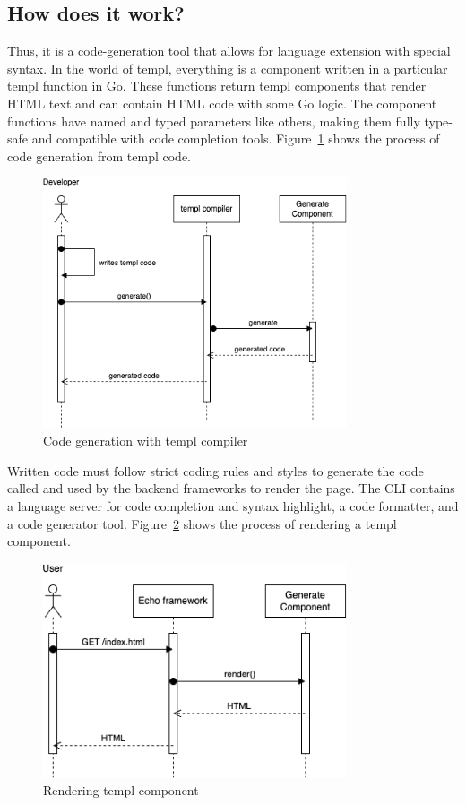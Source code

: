 \subsection{How does it work?}
Thus, it is a code-generation tool that allows for language extension with special syntax. In the world of templ, everything is a component written in a particular templ function in Go. These functions return templ components that render HTML text and can contain HTML code with some Go logic. The component functions have named and typed parameters like others, making them fully type-safe and compatible with code completion tools. Figure~\ref{fig:templ-generation} shows the process of code generation from templ code.

\begin{figure}[!h]
    \centering
    \includegraphics[width=0.8\textwidth, keepaspectratio]{figures/templ_sequence_generation.drawio.png}
    \caption{Code generation with templ compiler}
    \label{fig:templ-generation}
\end{figure}

Written code must follow strict coding rules and styles to generate the code called and used by the backend frameworks to render the page. The CLI contains a language server for code completion and syntax highlight, a code formatter, and a code generator tool. Figure~\ref{fig:templ-rendering} shows the process of rendering a templ component.

\begin{figure}[!h]
    \centering
    \includegraphics[width=0.8\textwidth, keepaspectratio]{figures/templ_sequence_render.drawio.png}
    \caption{Rendering templ component}
    \label{fig:templ-rendering}
\end{figure}

